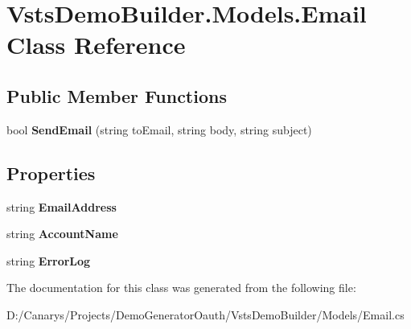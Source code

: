 \hypertarget{class_vsts_demo_builder_1_1_models_1_1_email}{}\section{Vsts\+Demo\+Builder.\+Models.\+Email Class Reference}
\label{class_vsts_demo_builder_1_1_models_1_1_email}
\subsection*{Public Member Functions}
\begin{DoxyCompactItemize}
\item 
\mbox{\label{class_vsts_demo_builder_1_1_models_1_1_email_af683ce06cdb3cadc83109f361755b355}} 
bool {\bfseries Send\+Email} (string to\+Email, string body, string subject)
\end{DoxyCompactItemize}
\subsection*{Properties}
\begin{DoxyCompactItemize}
\item 
\mbox{\label{class_vsts_demo_builder_1_1_models_1_1_email_a21fcc33db645c455b085ffe43bf85a64}} 
string {\bfseries Email\+Address}
\item 
\mbox{\label{class_vsts_demo_builder_1_1_models_1_1_email_ad331a6cc88cefa517a6478a57af51af6}} 
string {\bfseries Account\+Name}
\item 
\mbox{\label{class_vsts_demo_builder_1_1_models_1_1_email_a7e6ff04fb2e03180641c4a4070bb4d69}} 
string {\bfseries Error\+Log}
\end{DoxyCompactItemize}


The documentation for this class was generated from the following file\+:\begin{DoxyCompactItemize}
\item 
D\+:/\+Canarys/\+Projects/\+Demo\+Generator\+Oauth/\+Vsts\+Demo\+Builder/\+Models/Email.\+cs\end{DoxyCompactItemize}
